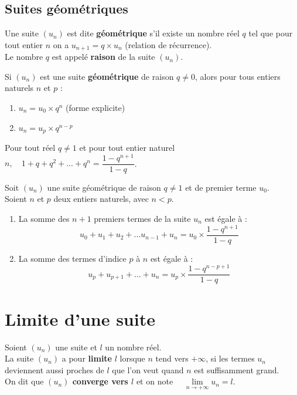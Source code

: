 \documentclass[a4paper,11pt,cours]{nsi} %
\begin{document}
\subsection*{Suites géométriques}

\begin{definition}[ ]
	Une suite $(u_n)$ est dite \textbf{géométrique} s'il existe un nombre réel $q$ tel que pour tout entier $n$ on a $u_{n+1}=q \times u_n$ \hspace{.5cm}(relation de récurrence).\\
	Le nombre $q$ est appelé \textbf{raison} de la suite $(u_n)$.
\end{definition}

\begin{propriete}[ ]
	Si $(u_n)$ est une suite \textbf{géométrique} de raison $q\neq 0$, alors pour tous entiers naturels $n$ et $p$ :
	\begin{enumerate}[label=\textbullet]
		\item 	$u_n = u_0\times q^n $  \hspace{.5cm}(forme explicite)
		\item 	$u_n=u_p\times q^{n-p}$	
	\end{enumerate}
\end{propriete}

\begin{propriete}[]
    Pour tout réel $q\neq 1$ et pour tout entier naturel $n, \quad 1+q+q^2+...+q^n=\dfrac{1-q^{n+1}}{1-q}$.
\end{propriete}

\begin{propriete}
	Soit $(u_n)$ une suite géométrique de raison $q\neq 1$ et de premier terme $u_0$.\\
	Soient $n$ et $p $ deux entiers naturels, avec $n<p$.
	\begin{enumerate}[label=\textbullet]
		\item La somme des $n+1$ premiers termes de la suite $u_n$ est égale à :
		$$u_0+u_1+u_2+...u_{n-1}+u_n=u_0\times \dfrac{1-q^{n+1}}{1-q}$$
		\item La somme des termes d'indice $p$ à $n$ est égale à :
		$$u_p+u_{p+1}+...+u_n=u_p\times \dfrac{1-q^{n-p+1}}{1-q}$$
	\end{enumerate}
\end{propriete}

\section{Limite d'une suite}
\begin{definition}
    Soient $(u_n)$ une suite et $l$ un nombre réel.\\
    La suite $(u_n)$ a pour \textbf{limite} $l$ lorsque $n$ tend vers $+\infty$, si les termes $u_n$ deviennent aussi proches de $l$ que l'on veut quand $n$ est suffisamment grand.\\[.5em]
    On dit que \textbf{$(u_n)$ converge vers $l$} et on note $\quad\lim\limits_{n\to+\infty}u_n=l$.
\end{definition}
\end{document}
